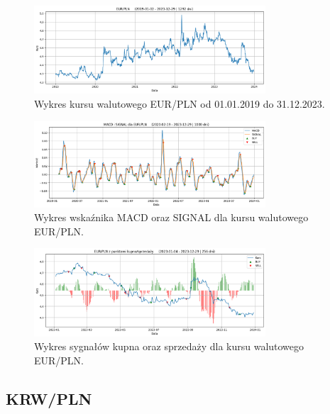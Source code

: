 \documentclass[12pt, a4paper]{article}
\begin{document}
\begin{figure}[ht]
    \centering
    \includegraphics[width=0.77\textwidth]{eur_pln_value.png}
    \caption{Wykres kursu walutowego EUR/PLN od 01.01.2019 do 31.12.2023.}
    \label{fig:all:eur_pln_value}
\end{figure}
\begin{figure}[ht]
    \centering
    \includegraphics[width=0.77\textwidth]{eur_pln_macd_signal.png}
    \caption{Wykres wskaźnika MACD oraz SIGNAL dla kursu walutowego EUR/PLN.}
    \label{fig:all:eur_pln_macd_signal}
\end{figure}
\begin{figure}[ht]
    \centering
    \includegraphics[width=0.77\textwidth]{eur_pln_value_buy_sell.png}
    \caption{Wykres sygnałów kupna oraz sprzedaży dla kursu walutowego EUR/PLN.}
    \label{fig:all:eur_pln_value_buy_sell}
\end{figure}

\pagebreak






\subsection{KRW/PLN}
\end{document}
